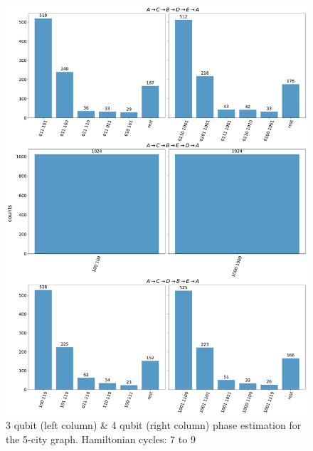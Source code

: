 \documentclass[msc,oneside]{ubcthesis}
\begin{document}
	\begin{figure}[!h]
		\centering
		\includegraphics[width=\textwidth,height=0.9\textheight,keepaspectratio]{"graphics/7-9-5city"}
		\caption{3 qubit (left column) \& 4 qubit (right column) phase estimation for the 5-city graph. Hamiltonian cycles: 7 to 9}
		\label{fig:5-city-7-9}
	\end{figure}		
	
\end{document}

